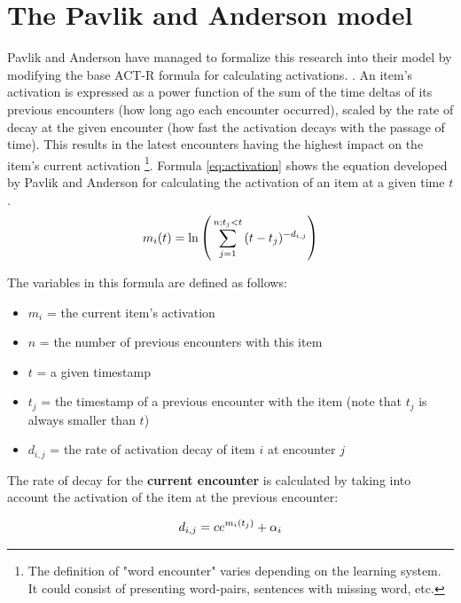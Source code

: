 \documentclass[a4paper]{report}
\begin{document}
\section{The Pavlik and Anderson model}
Pavlik and Anderson have managed to formalize this research into their model by modifying the base ACT-R formula for calculating activations. \citep{panderson05}. An item's activation is expressed as a power function of the sum of the time deltas of its previous encounters (how long ago each encounter occurred), scaled by the rate of decay at the given encounter (how fast the activation decays with the passage of time). This results in the latest encounters having the highest impact on the item's current activation \footnote{The definition of "word encounter" varies depending on the learning system. It could consist of presenting word-pairs, sentences with missing word, etc.}.
Formula \ref{eq:activation} shows the equation developed by Pavlik and Anderson for calculating the activation of an item at a given time $t$. 
\begin{equation}
\begin{large}
\label{eq:activation}
m_i(t) = \ln{\Bigg(\sum_{j=1}^{n;t_j<t}{(t - t_j)^{-d_{i,j}}}\Bigg)}
\end{large}
\end{equation}

The variables in this formula are defined as follows:
\begin{itemize}
    \item $m_i$     = the current item's activation
    \item $n$       = the number of previous encounters with this item
    \item $t$       = a given timestamp
    \item $t_j$     = the timestamp of a previous encounter with the item (note that $t_j$ is always smaller than $t$)
    \item $d_{i,j}$ = the rate of activation decay of item $i$ at encounter $j$
\end{itemize}

The rate of decay for the \textbf{current encounter} is calculated by taking into account the activation of the item at the previous encounter:

\begin{equation}
\begin{large}
\label{eq:decay}
d_{i,j} = ce^{m_i(t_j)} + \alpha_i
\end{large}
\end{equation}
\end{document}
